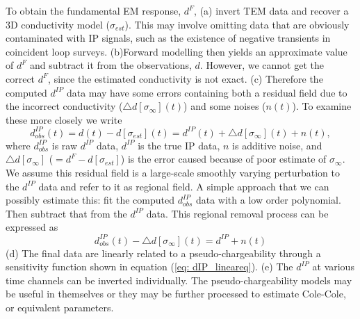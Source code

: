 \documentclass[a4paper, 11pt]{article}
\newcommand{\siginf}{\sigma_\infty}
\newcommand{\dip}{d^{IP}}
\begin{document}
To obtain the fundamental EM response, $d^F$, (a) invert TEM data and recover a 3D conductivity model ($\sigma_{est}$). This may involve omitting data that are obviously contaminated
with IP signals, such as the existence of negative transients in coincident loop surveys. (b)Forward modelling then yields an approximate value of $d^F$ and subtract it from the observations, $d$. However, we cannot get the correct $d^F$, since the estimated conductivity is not exact. (c) Therefore the computed $\dip$ data may have some errors containing both a residual field due to the incorrect conductivity ($\triangle d[\siginf](t)$) and some noises ($n(t)$). 
To examine these more closely we write
\begin{equation}
  \dip_{obs}(t) = d(t) - d[\sigma_{est}](t) = \dip(t) + \triangle d[\siginf](t) + n(t),
  \label{eq: IPdatum_obs}
\end{equation}
where $\dip_{obs}$ is raw $\dip$ data, $\dip$ is the true IP data, $n$ is additive noise, and $\triangle d[\siginf]$ ($=d^{F}-d[\sigma_{est}]$) is the error caused because of poor estimate of $\siginf$. We assume this residual field is a large-scale smoothly varying perturbation to the $\dip$ data and refer to it as regional field. A simple approach that we can possibly estimate this: fit the computed $\dip_{obs}$ data with a low order polynomial. Then subtract that from the $\dip$ data. This regional removal process can be expressed as
\begin{equation}
    \dip_{obs}(t) - \triangle d[\siginf](t) = \dip + n(t)
\end{equation}
(d) The final data are linearly related to a pseudo-chargeability through a sensitivity function shown in equation (\ref{eq: dIP_lineareq}). (e) The $\dip$ at various time channels can be inverted individually. The pseudo-chargeability models may be useful in themselves or they may be further processed to estimate Cole-Cole, or equivalent parameters.

\end{document}
